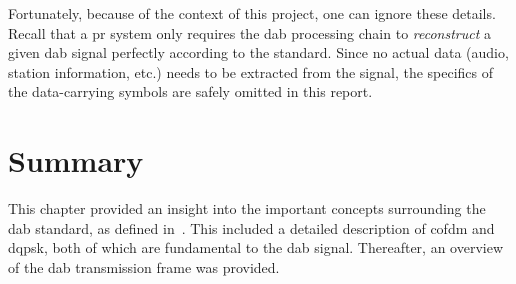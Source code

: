 \documentclass[class=report,11pt,crop=false]{standalone}
\begin{document}
Fortunately, because of the context of this project, one can ignore these details. Recall that a \gls{pr} system only requires the \gls{dab} processing chain to \emph{reconstruct} a given \gls{dab} signal perfectly according to the standard. Since no actual data (audio, station information, etc.) needs to be extracted from the signal, the specifics of the data-carrying symbols are safely omitted in this report.

\section{Summary}
This chapter provided an insight into the important concepts surrounding the \gls{dab} standard, as defined in~\cite{dabstandard}. This included a detailed description of \gls{cofdm} and \gls{dqpsk}, both of which are fundamental to the \gls{dab} signal. Thereafter, an overview of the \gls{dab} transmission frame was provided.

\ifstandalone

\printnoidxglossary[type=\acronymtype, nonumberlist]
\fi
\end{document}
